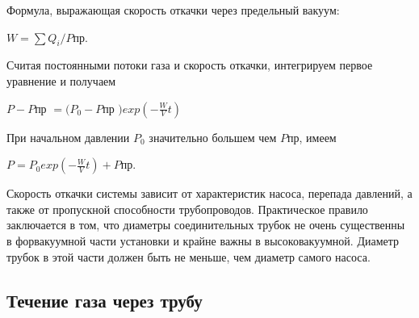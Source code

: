 \documentclass[a4paper]{article}
\begin{document}
Формула, выражающая скорость откачки через предельный вакуум:
\begin{center}
$W = \sum Q_i / P$пр.
\end{center}

Считая постоянными потоки газа и скорость откачки, интегрируем первое уравнение и получаем
\begin{center}
$P - P$пр $= (P_0 - P$пр $) exp(-\frac{W}{V}t)$
\end{center}
При начальном давлении $P_0$ значительно большем чем $P$пр, имеем
\begin{center}
$P = P_0 exp(-\frac{W}{V}t) + P$пр.
\end{center}

Скорость откачки системы зависит от характеристик насоса, перепада давлений, а также от пропускной способности трубопроводов. Практическое правило заключается в том, что диаметры соединительных трубок не очень существенны в форвакуумной части установки и крайне важны в высоковакуумной. Диаметр трубок в этой части должен быть не меньше, чем диаметр самого насоса.

\subsection{Течение газа через трубу}
\end{document}
